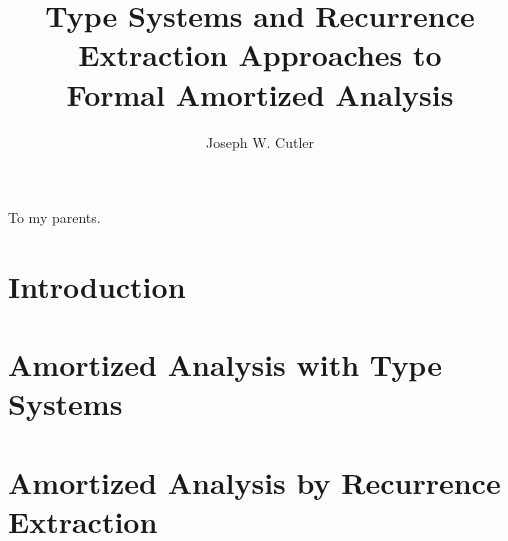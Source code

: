 \documentclass[final]{westhesis}
\title{Type Systems and Recurrence Extraction Approaches to\\ Formal Amortized Analysis}
\author{Joseph W. Cutler}
\begin{document}
\begin{abstract}
\end{abstract}

\begin{dedication}
To my parents.
\end{dedication}

\begin{acknowledgements}

\end{acknowledgements}


\frontmatter
\maketitle
\tableofcontents
\mainmatter


\chapter{Introduction}
\label{ch:intro}


\chapter{Amortized Analysis with Type Systems}
\label{ch:lambda-amor}



\chapter{Amortized Analysis by Recurrence Extraction}
\label{ch:rec-extr}
%

%




\appendix
\renewcommand\chaptername{Appendix}

\chapter{}
\label{appendix:a}
%

\chapter{}
\label{appendix:b}
%
\end{document}
